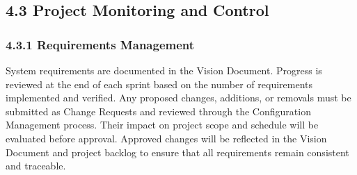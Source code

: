 \documentclass[12pt]{article}
\begin{document}
\subsection*{4.3 Project Monitoring and Control}
\par\medskip
\hypertarget{sec:431-requirements-management}{}
\subsubsection*{4.3.1 Requirements Management}
\par\medskip
System requirements are documented in the Vision Document. Progress is reviewed at the end of each sprint based on the number of requirements implemented and verified. Any proposed changes, additions, or removals must be submitted as Change Requests and reviewed through the Configuration Management process. Their impact on project scope and schedule will be evaluated before approval. Approved changes will be reflected in the Vision Document and project backlog to ensure that all requirements remain consistent and traceable.
\par\medskip
\hypertarget{sec:432-reporting-and-measurement}{}
\end{document}
